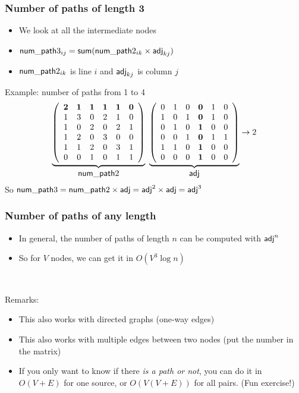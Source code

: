 \documentclass[12pt]{beamer}
\begin{document}
\begin{frame}
\frametitle{Number of paths of length 3}
\begin{itemize}
\item We look at all the intermediate nodes
\item $\mathsf{num\_path}3_{ij} = \textsf{sum}(\mathsf{num\_path}2_{ik} \times \mathsf{adj}_{kj})$
\item $\mathsf{num\_path}2_{ik}$ is line $i$ and $\mathsf{adj}_{kj}$ is column $j$
\end{itemize}

Example: number of paths from 1 to 4
\[
\underbrace{
\left(
\begin{array}{cccccc}
\mathbf{2}&\mathbf{1}&\mathbf{1}&\mathbf{1}&\mathbf{1}&\mathbf{0}\\
1&3&0&2&1&0\\
1&0&2&0&2&1\\
1&2&0&3&0&0\\
1&1&2&0&3&1\\
0&0&1&0&1&1\\
\end{array}
\right)
}_{\mbox{$\mathsf{num\_path}2$}}
\ \underbrace{
\left(
\begin{array}{cccccc}
0&1&0&\mathbf{0}&1&0\\
1&0&1&\mathbf{0}&1&0\\
0&1&0&\mathbf{1}&0&0\\
0&0&1&\mathbf{0}&1&1\\
1&1&0&\mathbf{1}&0&0\\
0&0&0&\mathbf{1}&0&0\\
\end{array}
\right)
}_{\mbox{$\mathsf{adj}$}}
\rightarrow 2
\]
So $\mathsf{num\_path}3 = \mathsf{num\_path}2 \times \mathsf{adj} = \mathsf{adj}^2 \times \mathsf{adj} = \mathsf{adj}^3$
\end{frame}

\begin{frame}
\frametitle{Number of paths of any length}
\begin{itemize}
\item In general, the number of paths of length $n$ can be computed with $\mathsf{adj}^n$
\item So for $V$ nodes, we can get it in $O(V^3 \log n)$
\end{itemize}

~

Remarks:
\begin{itemize}
\item This also works with directed graphs (one-way edges)
\item This also works with multiple edges between two nodes (put the number in the matrix)
\item If you only want to know if there \emph{is a path or not}, you can do it in $O(V+E)$ for one source, or $O(V(V+E))$ for all pairs. (Fun exercise!)
\end{itemize}
\end{frame}
\end{document}
